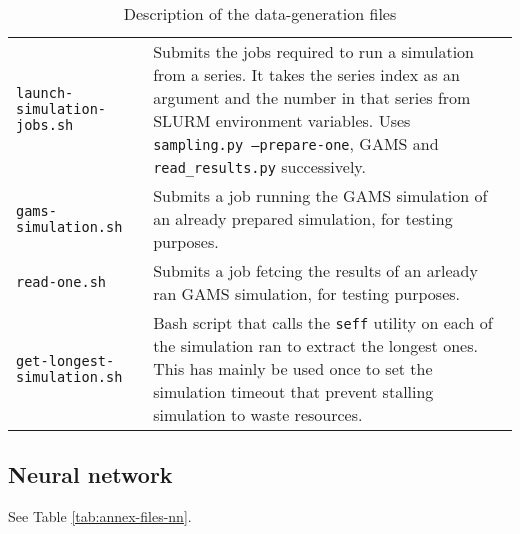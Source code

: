 \begin{table}[h]
\begin{tabular}{|p{}|p{}|}
        \texttt{launch-simulation-} \texttt{jobs.sh} & Submits the jobs required to run a simulation from a series. It takes the series index as an argument and the number in that series from SLURM environment variables. Uses \texttt{sampling.py --prepare-one}, GAMS and \texttt{read\_results.py} successively. \\
        \texttt{gams-simulation.sh} & Submits a job running the GAMS simulation of an already prepared simulation, for testing purposes. \\
        \texttt{read-one.sh} & Submits a job fetcing the results of an arleady ran GAMS simulation, for testing purposes. \\
        \texttt{get-longest-} \texttt{simulation.sh} & Bash script that calls the \texttt{seff} utility on each of the simulation ran to extract the longest ones. This has mainly be used once to set the simulation timeout that prevent stalling simulation to waste resources. \\ \hline
    \end{tabular}
    \caption{Description of the data-generation files}
    \label{tab:annex-files-datagen}
\end{table}

\subsection*{Neural network}

See Table \ref{tab:annex-files-nn}.

